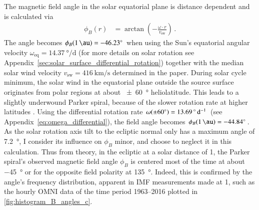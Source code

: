 The magnetic field angle in the solar equatorial plane is distance dependent and is calculated via
\begin{align}
	\phi_B(r) &= \arctan\left(-\frac{\omega \cdot r}{v_\text{sw}}\right)	\,.
\end{align}
The angle becomes $\phi_B(\SI{1}{\au}) = \SI{-46.23}{\degree}$ when using the Sun's equatorial angular velocity $\omega_\text{eq} = \SI{14.37}{\degree\per\day}$ (for more details on solar rotation see Appendix~\ref{sec:solar_surface_differential_rotation}) together with the median solar wind velocity $v_\text{sw} = \SI{416}{\km\per\s}$ determined in the paper. During solar cycle minimum, the solar wind in the equatorial plane outside the source surface originates from polar regions at about \SI{+-60}{\degree} heliolatitude. This leads to a slightly underwound Parker spiral, because of the slower rotation rate at higher latitudes \citep{Banaszkiewicz1998}. Using the differential rotation rate $\omega(\SI{+-60}{\degree}) = \SI{13.69}{\degree\per\day}$ (see Appendix~\ref{eq:omega_differential}), the field angle becomes $\phi_B(\SI{1}{\au}) = \SI{-44.84}{\degree}$. As the solar rotation axis tilt to the ecliptic normal only has a maximum angle of \SI{7.2}{\degree}, I consider its influence on $\phi_B$ minor, and choose to neglect it in this calculation. Thus from theory, in the ecliptic at a solar distance of \SI{1}{\au}, the Parker spiral's observed magnetic field angle $\phi_B$ is centered most of the time at about \SI{-45}{\degree} or for the opposite field polarity at \SI{135}{\degree}. Indeed, this is confirmed by the angle's frequency distribution, apparent in IMF measurements made at \SI{1}{\au}, such as the hourly OMNI data of the time period 1963--2016 plotted in \autoref{fig:histogram_B_angles_c}.
\begin{figure}[b]
\end{figure}

